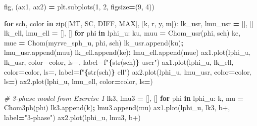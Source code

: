 \documentclass[
  a4paper,
  numbers=noendperiod,
  DIV=12]{scrreprt}
\newenvironment{Shaded}{\begin{snugshade}}{\end{snugshade}}
\newcommand{\BuiltInTok}[1]{#1}
\newcommand{\CommentTok}[1]{\textcolor[rgb]{0.56,0.35,0.01}{\textit{#1}}}
\newcommand{\ControlFlowTok}[1]{\textcolor[rgb]{0.13,0.29,0.53}{\textbf{#1}}}
\newcommand{\DecValTok}[1]{\textcolor[rgb]{0.00,0.00,0.81}{#1}}
\newcommand{\KeywordTok}[1]{\textcolor[rgb]{0.13,0.29,0.53}{\textbf{#1}}}
\newcommand{\NormalTok}[1]{#1}
\newcommand{\OperatorTok}[1]{\textcolor[rgb]{0.81,0.36,0.00}{\textbf{#1}}}
\newcommand{\SpecialCharTok}[1]{\textcolor[rgb]{0.81,0.36,0.00}{\textbf{#1}}}
\newcommand{\SpecialStringTok}[1]{\textcolor[rgb]{0.31,0.60,0.02}{#1}}
\newcommand{\StringTok}[1]{\textcolor[rgb]{0.31,0.60,0.02}{#1}}
\begin{document}
\begin{tcolorbox}
\begin{Shaded}
\begin{Highlighting}[]
\NormalTok{fig, (ax1, ax2) }\OperatorTok{=}\NormalTok{ plt.subplots(}\DecValTok{1}\NormalTok{, }\DecValTok{2}\NormalTok{, figsize}\OperatorTok{=}\NormalTok{(}\DecValTok{9}\NormalTok{, }\DecValTok{4}\NormalTok{))}

\ControlFlowTok{for}\NormalTok{ sch, color }\KeywordTok{in} \BuiltInTok{zip}\NormalTok{([MT, SC, DIFF, MAX], [}\StringTok{\textquotesingle{}k\textquotesingle{}}\NormalTok{, }\StringTok{\textquotesingle{}r\textquotesingle{}}\NormalTok{, }\StringTok{\textquotesingle{}y\textquotesingle{}}\NormalTok{, }\StringTok{\textquotesingle{}m\textquotesingle{}}\NormalTok{]):}
\NormalTok{    lk\_usr, lmu\_usr }\OperatorTok{=}\NormalTok{ [], []}
\NormalTok{    lk\_ell, lmu\_ell }\OperatorTok{=}\NormalTok{ [], []}
    \ControlFlowTok{for}\NormalTok{ phi }\KeywordTok{in}\NormalTok{ lphi\_u:}
\NormalTok{        ku, muu }\OperatorTok{=}\NormalTok{ Chom\_usr(phi, sch)}
\NormalTok{        ke, mue }\OperatorTok{=}\NormalTok{ Chom(myrve\_sph\_u, phi, sch)}
\NormalTok{        lk\_usr.append(ku)}\OperatorTok{;}\NormalTok{ lmu\_usr.append(muu)}
\NormalTok{        lk\_ell.append(ke)}\OperatorTok{;}\NormalTok{ lmu\_ell.append(mue)}
\NormalTok{    ax1.plot(lphi\_u, lk\_usr,  color}\OperatorTok{=}\NormalTok{color, ls}\OperatorTok{=}\StringTok{\textquotesingle{}{-}\textquotesingle{}}\NormalTok{,  label}\OperatorTok{=}\SpecialStringTok{f"}\SpecialCharTok{\{}\BuiltInTok{str}\NormalTok{(sch)}\SpecialCharTok{\}}\SpecialStringTok{ user"}\NormalTok{)}
\NormalTok{    ax1.plot(lphi\_u, lk\_ell,  color}\OperatorTok{=}\NormalTok{color, ls}\OperatorTok{=}\StringTok{\textquotesingle{}{-}{-}\textquotesingle{}}\NormalTok{, label}\OperatorTok{=}\SpecialStringTok{f"}\SpecialCharTok{\{}\BuiltInTok{str}\NormalTok{(sch)}\SpecialCharTok{\}}\SpecialStringTok{ ell"}\NormalTok{)}
\NormalTok{    ax2.plot(lphi\_u, lmu\_usr, color}\OperatorTok{=}\NormalTok{color, ls}\OperatorTok{=}\StringTok{\textquotesingle{}{-}\textquotesingle{}}\NormalTok{)}
\NormalTok{    ax2.plot(lphi\_u, lmu\_ell, color}\OperatorTok{=}\NormalTok{color, ls}\OperatorTok{=}\StringTok{\textquotesingle{}{-}{-}\textquotesingle{}}\NormalTok{)}

\CommentTok{\# 3{-}phase model from Exercise 1}
\NormalTok{lk3, lmu3 }\OperatorTok{=}\NormalTok{ [], []}
\ControlFlowTok{for}\NormalTok{ phi }\KeywordTok{in}\NormalTok{ lphi\_u:}
\NormalTok{    k, mu }\OperatorTok{=}\NormalTok{ Chom3ph(phi)}
\NormalTok{    lk3.append(k)}\OperatorTok{;}\NormalTok{ lmu3.append(mu)}
\NormalTok{ax1.plot(lphi\_u, lk3,  }\StringTok{\textquotesingle{}b+\textquotesingle{}}\NormalTok{, label}\OperatorTok{=}\StringTok{"3{-}phase"}\NormalTok{)}
\NormalTok{ax2.plot(lphi\_u, lmu3, }\StringTok{\textquotesingle{}b+\textquotesingle{}}\NormalTok{)}


\end{Highlighting}
\end{Shaded}
\end{tcolorbox}
\end{document}

